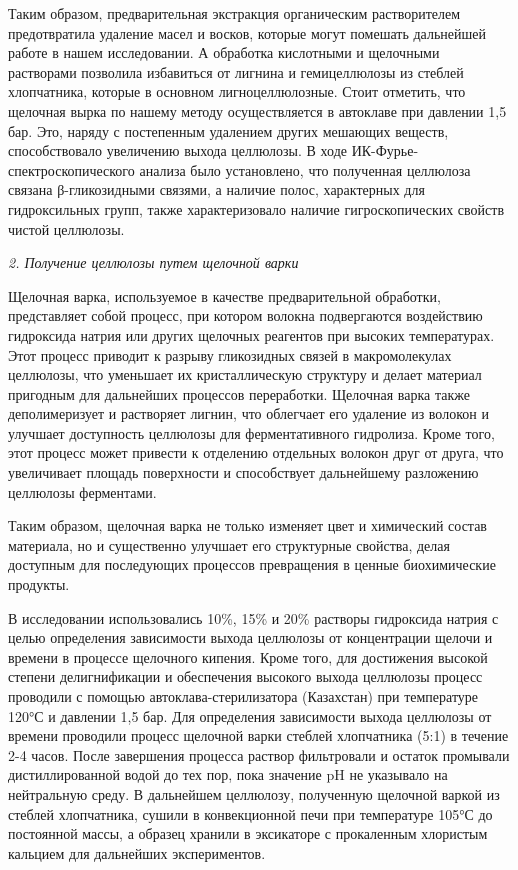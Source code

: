 Таким образом, предварительная экстракция органическим растворителем
предотвратила удаление масел и восков, которые могут помешать дальнейшей
работе в нашем исследовании. А обработка кислотными и щелочными
растворами позволила избавиться от лигнина и гемицеллюлозы из стеблей
хлопчатника, которые в основном лигноцеллюлозные. Стоит отметить, что
щелочная вырка по нашему методу осуществляется в автоклаве при давлении
1,5 бар. Это, наряду с постепенным удалением других мешающих веществ,
способствовало увеличению выхода целлюлозы. В ходе
ИК-Фурье-спектроскопического анализа было установлено, что полученная
целлюлоза связана β-гликозидными связями, а наличие полос, характерных
для гидроксильных групп, также характеризовало наличие гигроскопических
свойств чистой целлюлозы.

\emph{2. Получение целлюлозы путем щелочной варки}

Щелочная варка, используемое в качестве предварительной обработки,
представляет собой процесс, при котором волокна подвергаются воздействию
гидроксида натрия или других щелочных реагентов при высоких
температурах. Этот процесс приводит к разрыву гликозидных связей в
макромолекулах целлюлозы, что уменьшает их кристаллическую структуру и
делает материал пригодным для дальнейших процессов переработки. Щелочная
варка также деполимеризует и растворяет лигнин, что облегчает его
удаление из волокон и улучшает доступность целлюлозы для ферментативного
гидролиза. Кроме того, этот процесс может привести к отделению отдельных
волокон друг от друга, что увеличивает площадь поверхности и
способствует дальнейшему разложению целлюлозы ферментами.

Таким образом, щелочная варка не только изменяет цвет и химический
состав материала, но и существенно улучшает его структурные свойства,
делая доступным для последующих процессов превращения в ценные
биохимические продукты.

В исследовании использовались 10\%, 15\% и 20\% растворы гидроксида
натрия с целью определения зависимости выхода целлюлозы от концентрации
щелочи и времени в процессе щелочного кипения. Кроме того, для
достижения высокой степени делигнификации и обеспечения высокого выхода
целлюлозы процесс проводили с помощью автоклава-стерилизатора
(Казахстан) при температуре 120°С и давлении 1,5 бар. Для определения
зависимости выхода целлюлозы от времени проводили процесс щелочной варки
стеблей хлопчатника (5:1) в течение 2-4 часов. После завершения процесса
раствор фильтровали и остаток промывали дистиллированной водой до тех
пор, пока значение pH не указывало на нейтральную среду. В дальнейшем
целлюлозу, полученную щелочной варкой из стеблей хлопчатника, сушили в
конвекционной печи при температуре 105°С до постоянной массы, а образец
хранили в эксикаторе с прокаленным хлористым кальцием для дальнейших
экспериментов.

